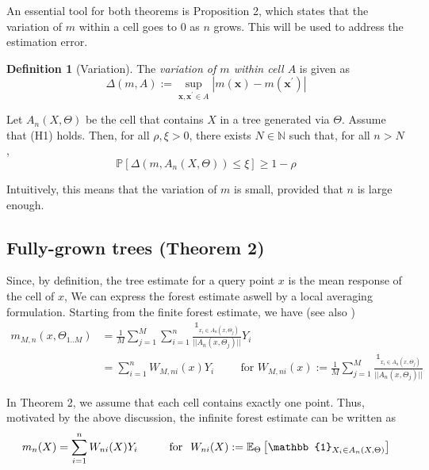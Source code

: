 \documentclass[10pt]{article}
\theoremstyle{definition}
\newtheorem{mydef}{Definition}[section]
\begin{document}
An essential tool for both theorems is Proposition 2, which states that the
variation of $m$ within a cell goes to $0$ as $n$ grows. This will be used to
address the estimation error.

\begin{mydef}[Variation]
  The \textit{variation of $m$ within cell $A$} is given as
  $$\Delta(m, A):=\sup _{\mathbf{x}, \mathbf{x}^{\prime} \in A}\left|m(\mathbf{x})-m\left(\mathbf{x}^{\prime}\right)\right|$$
\end{mydef}

\begin{myprop}
  Let $A_n(X, \Theta)$ be the cell that contains $X$ in a tree generated via $\Theta$.
  Assume that (H1) holds. Then, for all $\rho, \xi>0$, there exists $N \in
  \mathbb{N}$ such that, for all $n>N$,
$$
\mathbb{P}\left[\Delta\left(m, A_n(X, \Theta)\right) \leq \xi\right]
\geq 1-\rho
$$
\end{myprop}

Intuitively, this means that the variation of $m$ is small, provided that $n$ is
large enough.



\subsection{Fully-grown trees (Theorem 2)}


Since, by
definition, the tree
estimate for a query point $x$ is the mean response of the cell of $x$,
We
can express the forest estimate aswell by a local averaging formulation.
Starting from the finite forest estimate, we have (see also \cite{biau_RandomForestGuided_2016})
\begin{align*}
  m_{M, n}(x, \Theta_{1..M}) 
  &= \frac{1}{M} \sum_{j=1}^M \sum_{i=1}^n \frac{\mathbb{1}_{x_{i} \in A_{n}(x, \Theta_{j})}}{\lvert \lvert A_{n}(x, \Theta_{j}) \rvert \rvert } Y_i \\
  &= \sum_{i=1}^n W_{M,ni}(x) Y_{i}
    \hspace{1cm}
    \text{
    for $W_{M,ni}(x) := \frac{1}{M} \sum_{j=1}^M \frac{\mathbb{1}_{x_{i} \in A_{n}(x, \Theta_{j})}}{\lvert \lvert A_{n}(x, \Theta_{j}) \rvert \rvert}$
    }
\end{align*}

In Theorem 2, we assume that each cell contains exactly one point. Thus,
motivated by the above discussion, the infinite forest estimate can be written as
$$
m_{n}(X) = \sum_{i=1}^n W_{ni}(X)Y_{i} \hspace{1cm} \text{for} \hspace{0.25cm} W_{ni}(X) := \mathbb{E}_{\Theta}\left[ \mathbb{1}_{X_{i}\in A_{n}(X, \Theta)}\right]
$$
\end{document}
